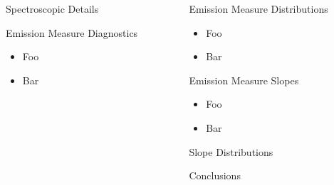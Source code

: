 \documentclass[final]{beamer}
\begin{document}
\begin{frame}
\begin{columns}[T]
\begin{column}{0.49\linewidth}
\begin{block}{Spectroscopic Details}
    \end{block}
    \begin{block}{Emission Measure Diagnostics}
      \vspace{-1ex}
      \begin{itemize}
      \item Foo
      \item Bar
      \end{itemize}
      \vspace{-2ex}
      \begin{figure}
      \end{figure}
      \vspace{-2ex}
    \end{block}
  \end{column}
  \begin{column}{0.49\linewidth}
    \begin{block}{Emission Measure Distributions}
      \vspace{-1ex}
      \begin{itemize}
      \item Foo
      \item Bar
      \end{itemize}
      \vspace{-2ex}
      \begin{figure}
      \end{figure}
      \vspace{-2ex}
    \end{block}
    \begin{block}{Emission Measure Slopes}
      \vspace{-1ex}
      \begin{itemize}
      \item Foo
      \item Bar
      \end{itemize}
      \vspace{-1ex}
    \end{block}
    \begin{block}{Slope Distributions}
    \end{block}
    \begin{block}{Conclusions}

\end{block}
\end{column}
\end{columns}
\end{frame}
\end{document}
